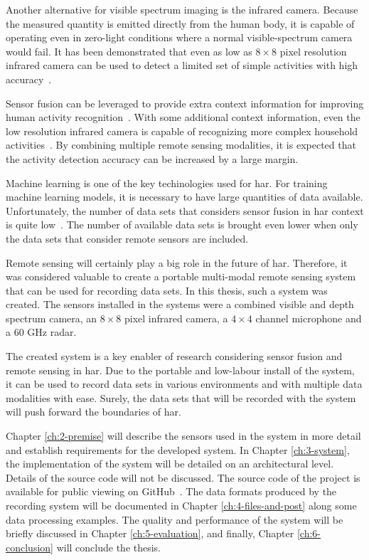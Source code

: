 Another alternative for visible spectrum imaging is the infrared camera.
Because the measured quantity is emitted directly from the human body,
it is capable of operating even in zero-light conditions where a normal visible-spectrum camera would fail.
It has been demonstrated that even as low as $8 \times 8$ pixel resolution infrared camera can be used
to detect a limited set of simple activities with high accuracy~\cite{ir-simple-activities}.

Sensor fusion can be leveraged to provide extra context information for improving human activity recognition~\cite{fusion1, fusion2}.
With some additional context information,
even the low resolution infrared camera is capable of recognizing more complex household activities~\cite{ir-household}.
By combining multiple remote sensing modalities,
it is expected that the activity detection accuracy can be increased by a large margin.

Machine learning is one of the key techinologies used for \gls{har}.
For training machine learning models, it is necessary to have large quantities of data available.
Unfortunately, the number of data sets that considers sensor fusion in \gls{har} context is quite low~\cite{sensing-survey}.
The number of available data sets is brought even lower when only the data sets that consider remote sensors are included.

Remote sensing will certainly play a big role in the future of \gls{har}.
Therefore, it was considered valuable to create a portable multi-modal remote sensing system that can be used for recording data sets.
In this thesis, such a system was created.
The sensors installed in the systems were a combined visible and depth spectrum camera,
an $8 \times 8$ pixel infrared camera, a $4 \times 4$ channel microphone and a 60 GHz radar.

The created system is a key enabler of research considering sensor fusion and remote sensing in \gls{har}.
Due to the portable and low-labour install of the system,
it can be used to record data sets in various environments and with multiple data modalities with ease.
Surely, the data sets that will be recorded with the system will push forward the boundaries of \gls{har}.

Chapter \ref{ch:2-premise} will describe the sensors used in the system in more detail and establish requirements for the developed system.
In Chapter \ref{ch:3-system}, the implementation of the system will be detailed on an architectural level.
Details of the source code will not be discussed. The source code of the project is available for public viewing on GitHub~\cite{github-link}.
The data formats produced by the recording system will be documented in Chapter \ref{ch:4-files-and-post} along some data processing examples.
The quality and performance of the system will be briefly discussed in Chapter \ref{ch:5-evaluation},
and finally, Chapter \ref{ch:6-conclusion} will conclude the thesis.
